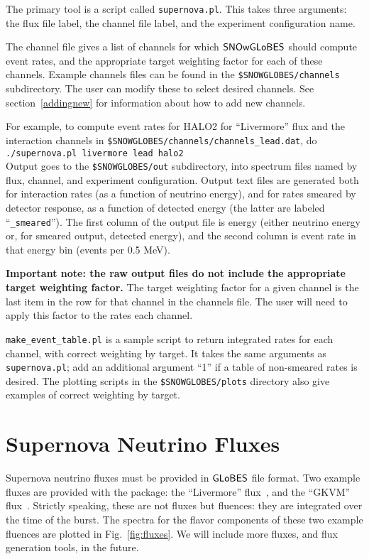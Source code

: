 \documentclass[12pt]{article}
\newcommand{\globes}{\sf{GLoBES}}
\newcommand{\snowglobes}{\sf{SNOwGLoBES}}
\begin{document}
The primary tool is a script called \texttt{supernova.pl}.  This takes three arguments: the flux file label, the channel file label, and the experiment configuration name.

The channel file gives a list of channels for which $\snowglobes$
should compute event rates, and the appropriate target weighting
factor for each of these channels.  Example channels files can be
found in the \texttt{\$SNOWGLOBES/channels} subdirectory.  The user can
modify these to select desired channels.  See section~\ref{addingnew}
for information about how to add new channels.

For example, to compute event rates for HALO2 for ``Livermore'' flux and  the interaction channels in
\texttt{\$SNOWGLOBES/channels/channels\_lead.dat}, do\\

\texttt{./supernova.pl livermore lead halo2} \\

Output goes to the \texttt{\$SNOWGLOBES/out} subdirectory, into spectrum files
named by flux, channel, and experiment configuration.  Output text
files are generated both for interaction rates (as a function of
neutrino energy), and for rates smeared by detector response, as a
function of detected energy (the latter are labeled ``\texttt{\_smeared}'').  The
first column of the output file is energy (either neutrino energy or,
for smeared output, detected energy), and the second column is event
rate in that energy bin (events per 0.5 MeV).

\textbf{Important note: the raw output files do not include the
  appropriate target weighting factor.}  The target weighting factor
for a given channel is the last item in the row for that channel in
the channels file.  The user will need to apply this factor to the
rates each channel.

\texttt{make\_event\_table.pl} is a sample script to return integrated
rates for each channel, with correct weighting by target.   It takes the same arguments as \texttt{supernova.pl}; add an additional argument ``1'' if a table of non-smeared rates is desired.
The
plotting scripts in the \texttt{\$SNOWGLOBES/plots} directory also
give examples of correct weighting by target.

\section{Supernova Neutrino Fluxes}

Supernova neutrino fluxes must be provided in $\globes$ file format.  Two
example fluxes are provided with the package: the ``Livermore''
flux~\cite{Totani:1997vj}, and the ``GKVM'' flux~\cite{Gava:2009pj}.
Strictly speaking, these are not fluxes but fluences: they are
integrated over the time of the burst.  The spectra for the flavor
components of these two example fluences are plotted in
Fig.~\ref{fig:fluxes}.  We will include more fluxes, and flux generation tools, in the future.
\end{document}

